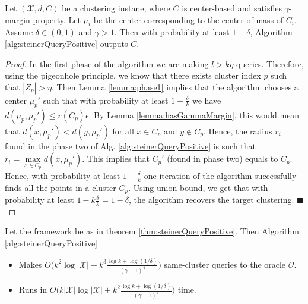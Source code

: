 \documentclass[orivec]{llncs}
\newcommand{\mc}{\mathcal}
\renewcommand{\qed}{\hfill\ensuremath{\blacksquare}}
\begin{document}
\begin{theorem}
\label{thm:steinerQueryPositive}
Let $(\mc X, d, C)$ be a clustering instane, where $C$ is center-based and satisfies $\gamma$-margin property. Let $\mu_i$ be the center corresponding to the center of mass of $C_i$.
Assume $\delta \in (0, 1)$ and $\gamma > 1$. Then with probability at least $1-\delta$, Algorithm \ref{alg:steinerQueryPositive} outputs $C$.
\end{theorem}

\begin{proof}
In the first phase of the algorithm we are making $l>k\eta$ queries. Therefore, using the pigeonhole principle, we know that there exists cluster index $p$ such that $|Z_p| > \eta$. Then Lemma \ref{lemma:phase1} implies that the algorithm chooses a center $\mu_p'$ such that with probability at least $1-\frac{\delta}{k}$ we have $d(\mu_p, \mu_p') \le r(C_p)\epsilon$. By Lemma \ref{lemma:hasGammaMargin}, this would mean that $d(x, \mu_p') < d(y, \mu_p')$ for all $x \in C_p$ and $y \not\in C_p$. Hence, the radius $r_i$ found in the phase two of Alg. \ref{alg:steinerQueryPositive} is such that $r_{i} = \max\limits_{x \in C_p} d(x, \mu_p')$. This implies that $C_p'$ (found in phase two) equals to $C_p$. Hence, with probability at least $1-\frac{\delta}{k}$ one iteration of the algorithm successfully finds all the points in a cluster $C_p$. Using union bound, we get that with probability at least $1-k\frac{\delta}{k} = 1-\delta$, the algorithm recovers the target clustering.
\qed 
\end{proof}

\begin{theorem}
\label{thm:steinerQueryPositiveComplexity}
Let the framework be as in theorem \ref{thm:steinerQueryPositive}. Then Algorithm \ref{alg:steinerQueryPositive} 
\begin{itemize}[nolistsep,noitemsep]
\item Makes $O\big(k^2\log |\mc X| + k^3\frac{\log k + \log (1/\delta)}{(\gamma - 1)^4}\big)$ same-cluster queries to the oracle $\mc O$.
\item Runs in $O\big(k|\mc X|\log |\mc X| + k^2\frac{\log k + \log (1/\delta)}{(\gamma - 1)^4}\big)$ time.
\end{itemize}
\end{theorem}
\end{document}
